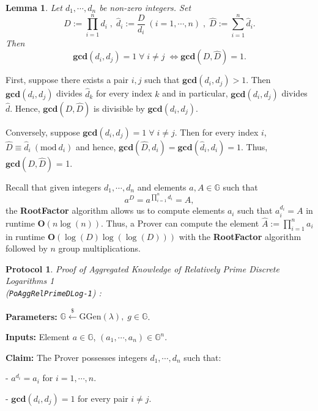 \documentclass[11pt, lettersize, notitlepage, leqno, footskip=0.6cm]{article}
\newcommand{\pl}{\prod\limits}
\newcommand{\slim}{\sum\limits}
\newcommand{\LRA}{\Longleftrightarrow}
\newcommand{\mb}{\mathbb}
\newcommand{\mbf}{\mathbf}
\newcommand{\mr}{\mathrm}
\newcommand{\lamb}{\lambda}
\newcommand{\what}{\widehat}
\newcommand{\vs}{\vspace{-0.15cm}}
\newcommand{\noin}{\noindent}
\newcommand{\Mod}[1]{\ (\mathrm{mod}\ #1)}
\newcommand{\GCD}{\mbf{gcd}}
\newtheorem{Lem}[Thm]{Lemma}
\newtheorem{Prot}[Thm]{Protocol}
\numberwithin{equation}{section}
\begin{document}
\begin{Lem}\label{lcm} Let $d_1,\cdots,d_n$ be non-zero integers. Set \vs $$D:= \pl_{i=1}^n d_i\;,\; \what{d}_i:= \frac{D}{d_i}\;(i=1,\cdots,n) \;,\;\what{D}:= \slim_{i=1}^n \what{d}_i.$$ Then \vs $$\GCD(d_i,d_j)=1\;\forall\;i\neq j\; \LRA \GCD(D, \what{D}) = 1 .$$\end{Lem}

\begin{prf} First, suppose there exists a pair $i,j$ such that $\GCD(d_i,d_j)> 1$. Then $\GCD(d_i,d_j)$ divides $\what{d}_k$ for every index $k$ and in particular, $\GCD(d_i,d_j)$ divides $\what{d}$. Hence, $\GCD(D,\what{D})$ is divisible by $\GCD(d_i,d_j)$.

Conversely, suppose $\GCD(d_i,d_j)=1\;\forall\;i\neq j$. Then for every index $i$, $\what{D}\equiv \what{d}_i\Mod{d_i} $ and hence, $\GCD(\what{D}, d_i) = \GCD(\what{d}_i, d_i) = 1$. Thus, $\GCD(D,\what{D})$ = 1.\end{prf}

\noin Recall that given integers $d_1,\cdots,d_n$ and elements $a,A\in\mb{G}$ such that \vs $$a^D = a^{\pl_{i=1}^n d_i} = A ,$$ the \textbf{RootFactor} algorithm allows us to compute elements $a_i$ such that $a_i^{d_i} = A$ in runtime $\mbf{O}(n\log(n))$. Thus, a Prover can compute the element $\what{A}:= \pl_{i=1}^n a_i$ in runtime $\mbf{O}(\log(D)\log(\log(D)))$ with the \textbf{RootFactor} algorithm followed by $n$ group multiplications.

\vspace{0.2cm}

\begin{Prot} \normalfont \textit{Proof of Aggregated Knowledge of Relatively Prime Discrete Logarithms} 1 \\(\verb|PoAggRelPrimeDLog-1|) :\end{Prot} \vspace{-0.3cm}

\noindent \textbf{Parameters:} $\mb{G}\xleftarrow{\$} \mr{GGen}(\lamb), \; g\in \mb{G}$.

\noindent \textbf{Inputs:} Element $a\in\mb{G}$, $(a_1,\cdots,a_n)\in \mb{G}^n$.

\noindent \textbf{Claim:} The Prover possesses integers $d_1,\cdots, d_n$ such that:

\noindent - $a^{d_i} = a_i$ for $i = 1,\cdots, n$.

\noindent - $\GCD(d_i, d_j) = 1$ for every pair $i\neq j$.
\end{document}
